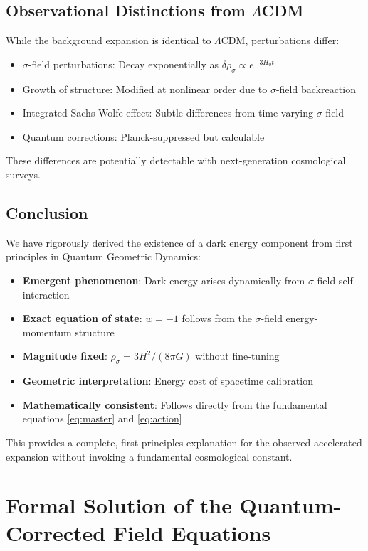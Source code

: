 \documentclass[11pt,a4paper]{article}
\theoremstyle{definition}
\theoremstyle{remark}
\begin{document}
	\subsection{Observational Distinctions from $\Lambda$CDM}
	While the background expansion is identical to $\Lambda$CDM, perturbations differ:
	\begin{itemize}
		\item $\sigma$-field perturbations: Decay exponentially as $\delta\rho_\sigma \propto e^{-3H_0 t}$
		\item Growth of structure: Modified at nonlinear order due to $\sigma$-field backreaction
		\item Integrated Sachs-Wolfe effect: Subtle differences from time-varying $\sigma$-field
		\item Quantum corrections: Planck-suppressed but calculable
	\end{itemize}
	These differences are potentially detectable with next-generation cosmological surveys.
	
	\subsection{Conclusion}
	We have rigorously derived the existence of a dark energy component from first principles in Quantum Geometric Dynamics:
	\begin{itemize}
		\item \textbf{Emergent phenomenon}: Dark energy arises dynamically from $\sigma$-field self-interaction
		\item \textbf{Exact equation of state}: $w = -1$ follows from the $\sigma$-field energy-momentum structure
		\item \textbf{Magnitude fixed}: $\rho_\sigma = 3H^2/(8\pi G)$ without fine-tuning
		\item \textbf{Geometric interpretation}: Energy cost of spacetime calibration
		\item \textbf{Mathematically consistent}: Follows directly from the fundamental equations \eqref{eq:master} and \eqref{eq:action}
	\end{itemize}
	This provides a complete, first-principles explanation for the observed accelerated expansion without invoking a fundamental cosmological constant.
	
	\section{Formal Solution of the Quantum-Corrected Field Equations}
	\label{sec:formal-solution}
	
\end{document}
